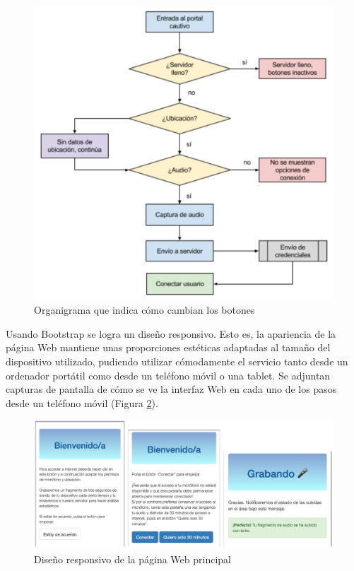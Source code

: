 \begin{figure}[!t]
\begin{center}
\includegraphics[width=0.75\linewidth]{./5_AnalisisOrganico/Img/flujoBotones.png}
\end{center}
\caption{Organigrama que indica cómo cambian los botones}
\label{flujoBotones}
\end{figure}

Usando Bootstrap se logra un diseño responsivo. Esto es, la apariencia de la página Web mantiene unas proporciones estéticas adaptadas al tamaño del dispositivo utilizado, pudiendo utilizar cómodamente el servicio tanto desde un ordenador portátil como desde un teléfono móvil o una tablet. Se adjuntan capturas de pantalla de cómo se ve la interfaz Web en cada uno de los pasos desde un teléfono móvil (Figura \ref{responsiveDesign}).

\begin{figure}[!t]
\begin{center}
\includegraphics[width=0.75\linewidth]{./5_AnalisisOrganico/Img/responsiveDesign.png}
\end{center}
\caption{Diseño responsivo de la página Web principal}
\label{responsiveDesign}
\end{figure}

